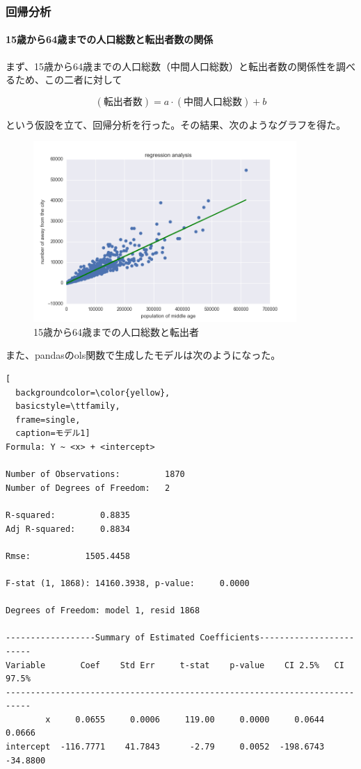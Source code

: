 \documentclass[a4paper,xelatex,ja=standard,jafont=hiragino-pron, 10pt]{bxjsarticle}
\begin{document}
\subsubsection{回帰分析}

\paragraph{15歳から64歳までの人口総数と転出者数の関係}

まず、15歳から64歳までの人口総数（中間人口総数）と転出者数の関係性を調べるため、この二者に対して

\begin{equation}
  (\mbox{転出者数}) = a \cdot (\mbox{中間人口総数}) + b
\end{equation}

という仮設を立て、回帰分析を行った。その結果、次のようなグラフを得た。

\begin{figure}[ht]
  \centering
  \includegraphics[clip, width=10.0cm]{../data/picture/regression_ma.png}
  \caption{15歳から64歳までの人口総数と転出者}
  \label{reg_ma}
\end{figure}

また、pandasのols関数で生成したモデルは次のようになった。

\begin{lstlisting}[
  backgroundcolor=\color{yellow},
  basicstyle=\ttfamily,
  frame=single,
  caption=モデル1]
Formula: Y ~ <x> + <intercept>

Number of Observations:         1870
Number of Degrees of Freedom:   2

R-squared:         0.8835
Adj R-squared:     0.8834

Rmse:           1505.4458

F-stat (1, 1868): 14160.3938, p-value:     0.0000

Degrees of Freedom: model 1, resid 1868

------------------Summary of Estimated Coefficients------------------------
Variable       Coef    Std Err     t-stat    p-value    CI 2.5%   CI 97.5%
---------------------------------------------------------------------------
        x     0.0655     0.0006     119.00     0.0000     0.0644     0.0666
intercept  -116.7771    41.7843      -2.79     0.0052  -198.6743   -34.8800
\end{lstlisting}
\end{document}
